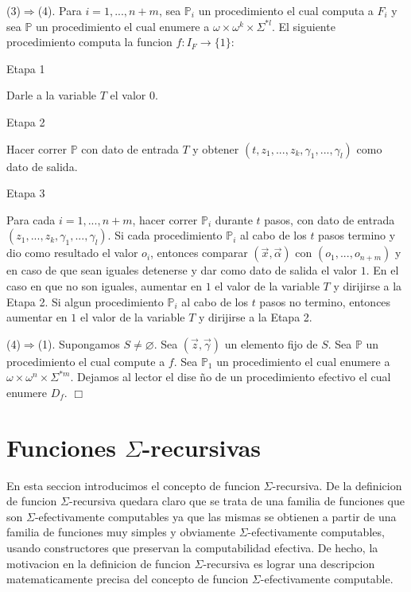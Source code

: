 (3)\(\Rightarrow \)(4). Para \(i=1,...,n+m\), sea \(\mathbb{P}_{i}\) un procedimiento el cual computa a \(F_{i}\) y sea \(\mathbb{P}\) un procedimiento el cual enumere a \(\omega \times \omega ^{k}\times \Sigma ^{\ast l}.\) El siguiente procedimiento computa la funcion \(f:I_{F}\rightarrow \{1\}\):

Etapa 1

Darle a la variable \(T\) el valor 0.

Etapa 2

Hacer correr \(\mathbb{P}\) con dato de entrada \(T\) y obtener \( (t,z_{1},...,z_{k},\gamma _{1},...,\gamma _{l})\) como dato de salida.

Etapa 3

Para cada \(i=1,...,n+m\), hacer correr \(\mathbb{P}_{i}\) durante \(t\) pasos, con dato de entrada \((z_{1},...,z_{k},\gamma _{1},...,\gamma _{l}).\) Si cada procedimiento \(\mathbb{P}_{i}\) al cabo de los \(t\) pasos termino y dio como resultado el valor \(o_{i}\), entonces comparar \((\vec{x},\vec{\alpha} )\) con \((o_{1},...,o_{n+m})\) y en caso de que sean iguales detenerse y dar como dato de salida el valor \(1\). En el caso en que no son iguales, aumentar en \(1\) el valor de la variable \(T\) y dirijirse a la Etapa 2. Si algun procedimiento \(\mathbb{P}_{i}\) al cabo de los \(t\) pasos no termino, entonces aumentar en \(1\) el valor de la variable \(T\) y dirijirse a la Etapa 2.

(4)\(\Rightarrow \)(1). Supongamos \(S\neq \varnothing .\) Sea \((\vec{z},\vec{ \gamma})\) un elemento fijo de \(S.\) Sea \(\mathbb{P}\) un procedimiento el cual compute a \(f\). Sea \(\mathbb{P}_{1}\) un procedimiento el cual enumere a \( \omega \times \omega ^{n}\times \Sigma ^{\ast m}.\) Dejamos al lector el dise \~{n}o de un procedimiento efectivo el cual enumere \(D_{f}\). \(\Box\)

\section{Funciones \(\Sigma \)-recursivas}

En esta seccion introducimos el concepto de funcion \(\Sigma \)-recursiva. De la definicion de funcion \(\Sigma \)-recursiva quedara claro que se trata de una familia de funciones que son \(\Sigma \)-efectivamente computables ya que las mismas se obtienen a partir de una familia de funciones muy simples y obviamente \(\Sigma \)-efectivamente computables, usando constructores que preservan la computabilidad efectiva. De hecho, la motivacion en la definicion de funcion \(\Sigma \)-recursiva es lograr una descripcion matematicamente precisa del concepto de funcion \(\Sigma \)-efectivamente computable.


